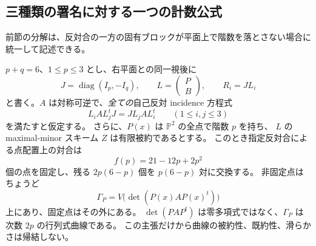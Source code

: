 \subsection{三種類の署名に対する一つの計数公式}
\label{subsec:all-self-opposite-signatures-v24}

前節の分解は、反対合の一方の固有ブロックが平面上で階数を落とさない場合に
統一して記述できる。

\begin{proposition}[固定点数の署名公式]
\label{prop:self-opposite-signature-count-v24}
$p+q=6$、$1\leq p\leq3$ とし、右平面との同一視後に
\[
 J=\operatorname{diag}(I_p,-I_q),\qquad
 L=\begin{pmatrix}P\\B\end{pmatrix},\qquad R_i=J L_i
\]
と書く。$A$ は対称可逆で、\emph{全ての}自己反対 incidence 方程式
\begin{equation}\label{eq:full-self-opposite-incidence-v24}
 L_i A L_j^tJ=J L_j A L_i^t\qquad(1\leq i,j\leq3)
\end{equation}
を満たすと仮定する。
さらに、$P(x)$ は $\mathbb P^2$ の全点で階数 $p$ を持ち、
$L$ の maximal-minor スキーム $Z$ は有限被約であるとする。
このとき指定反対合による点配置上の対合は
\[
 f(p)=21-12p+2p^2
\]
個の点を固定し、残る $2p(6-p)$ 個を $p(6-p)$ 対に交換する。
非固定点はちょうど
\[
 \Gamma_P=V\bigl(\det(P(x)AP(x)^t)\bigr)
\]
上にあり、固定点はその外にある。
$\det(PAP^t)$ は零多項式ではなく、$\Gamma_P$ は次数 $2p$ の行列式曲線である。
この主張だけから曲線の被約性、既約性、滑らかさは帰結しない。
\end{proposition}
